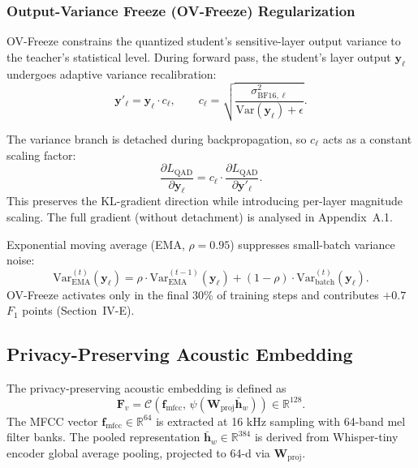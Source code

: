 \documentclass[lettersize,journal]{IEEEtran}
\begin{document}
\subsubsection{Output-Variance Freeze (OV-Freeze) Regularization}

OV-Freeze constrains the quantized student's sensitive-layer output variance to the teacher's statistical level. During forward pass, the student's layer output $\bm{y}_\ell$ undergoes adaptive variance recalibration:
\begin{equation}
\label{eq:ovf-rescale-en}
\bm{y}'_\ell = \bm{y}_\ell\cdot c_\ell, \qquad c_\ell = \sqrt{\frac{\sigma^2_{\mathrm{BF16},\ell}}{\mathrm{Var}(\bm{y}_\ell) + \epsilon}}.
\end{equation}

The variance branch is detached during backpropagation, so $c_\ell$ acts as a constant scaling factor:
\begin{equation}
\label{eq:ovf-detach-en}
\frac{\partial L_{\mathrm{QAD}}}{\partial\bm{y}_\ell} = c_\ell\cdot\frac{\partial L_{\mathrm{QAD}}}{\partial\bm{y}'_\ell}.
\end{equation}
This preserves the KL-gradient direction while introducing per-layer magnitude scaling. The full gradient (without detachment) is analysed in Appendix~A.1.

Exponential moving average (EMA, $\rho = 0.95$) suppresses small-batch variance noise:
\begin{equation}
\label{eq:ema}
\mathrm{Var}^{(t)}_{\mathrm{EMA}}(\bm{y}_\ell) = \rho\cdot\mathrm{Var}^{(t-1)}_{\mathrm{EMA}}(\bm{y}_\ell) + (1-\rho)\cdot\mathrm{Var}^{(t)}_{\mathrm{batch}}(\bm{y}_\ell).
\end{equation}
OV-Freeze activates only in the final 30\% of training steps and contributes $+0.7$ $F_1$ points (Section~IV-E).

\subsection{Privacy-Preserving Acoustic Embedding}

The privacy-preserving acoustic embedding is defined as
\begin{equation}
\label{eq:f-v}
\bm{F}_v = \mathcal{C}\!\left(\bm{f}_{\mathrm{mfcc}},\,\psi(\bm{W}_{\mathrm{proj}}\bar{\bm{h}}_w)\right)\in\mathbb{R}^{128}.
\end{equation}
The MFCC vector $\bm{f}_{\mathrm{mfcc}}\in\mathbb{R}^{64}$ is extracted at 16 kHz sampling with 64-band mel filter banks. The pooled representation $\bar{\bm{h}}_w\in\mathbb{R}^{384}$ is derived from Whisper-tiny encoder global average pooling, projected to 64-d via $\bm{W}_{\mathrm{proj}}$.
\end{document}
